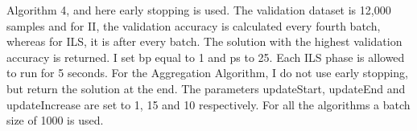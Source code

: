 \begin{center}
\begin{table}[!tb]
{{{            Algorithm 4, and here early stopping is used. The validation dataset is 12,000 samples and for
            II, the validation accuracy is calculated every fourth batch, whereas for ILS, it is after every batch.
            The solution with the highest validation accuracy is returned. I set bp equal to 1 and ps to 25.
            Each ILS phase is allowed to run for 5 seconds. 
            For the Aggregation Algorithm, I do not use early stopping, but return the solution at the end. The parameters
            updateStart, updateEnd and updateIncrease are set to 1, 15 and 10 respectively. For all the algorithms
            a batch size of 1000 is used.}}} 
\label{MBT_FMNIST}
\end{table}

\end{center}
